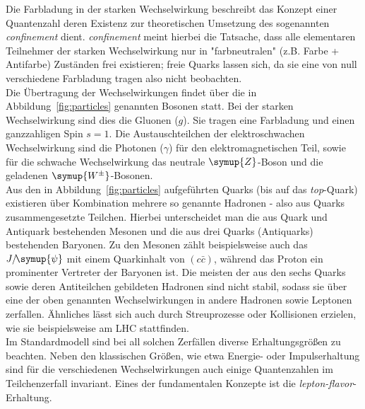 Die Farbladung in der starken Wechselwirkung beschreibt das Konzept einer Quantenzahl deren Existenz zur theoretischen Umsetzung des sogenannten \textit{confinement} dient. \textit{confinement} meint hierbei die Tatsache, dass alle elementaren Teilnehmer der starken Wechselwirkung nur in "farbneutralen" (z.B. Farbe + Antifarbe) Zuständen frei existieren; freie Quarks lassen sich, da sie eine von null verschiedene Farbladung tragen also nicht beobachten.\\
%
Die Übertragung der Wechselwirkungen findet über die in Abbildung~\ref{fig:particles} genannten Bosonen statt. Bei der starken Wechselwirkung sind dies die Gluonen ($g$). Sie tragen eine Farbladung und einen ganzzahligen Spin $s=1$. Die Austauschteilchen der elektroschwachen Wechselwirkung sind die Photonen ($\gamma$) für den elektromagnetischen Teil, sowie für die schwache Wechselwirkung das neutrale $\symup{Z}$-Boson und die geladenen $\symup{W^{\pm}}$-Bosonen. \\
%
Aus den in Abbildung~\ref{fig:particles} aufgeführten Quarks (bis auf das \textit{top}-Quark) existieren über Kombination mehrere so genannte Hadronen - also aus Quarks zusammengesetzte Teilchen. Hierbei unterscheidet man die aus Quark und Antiquark bestehenden Mesonen und die aus drei Quarks (Antiquarks) bestehenden Baryonen. Zu den Mesonen zählt beispielsweise auch das $J/\!\symup{\psi}$ mit einem Quarkinhalt von $(c\bar{c})$, während das Proton ein prominenter Vertreter der Baryonen ist. Die meisten der aus den sechs Quarks sowie deren Antiteilchen gebildeten Hadronen sind nicht stabil, sodass sie über eine der oben genannten Wechselwirkungen in andere Hadronen sowie Leptonen zerfallen. Ähnliches lässt sich auch durch Streuprozesse oder Kollisionen erzielen, wie sie beispielsweise am LHC stattfinden.\\
%
Im Standardmodell sind bei all solchen Zerfällen diverse Erhaltungsgrößen zu beachten. Neben den klassischen Größen, wie etwa Energie- oder Impulserhaltung sind für die verschiedenen Wechselwirkungen auch einige Quantenzahlen im Teilchenzerfall invariant. Eines der fundamentalen Konzepte ist die \textit{lepton-flavor}-Erhaltung.
%
